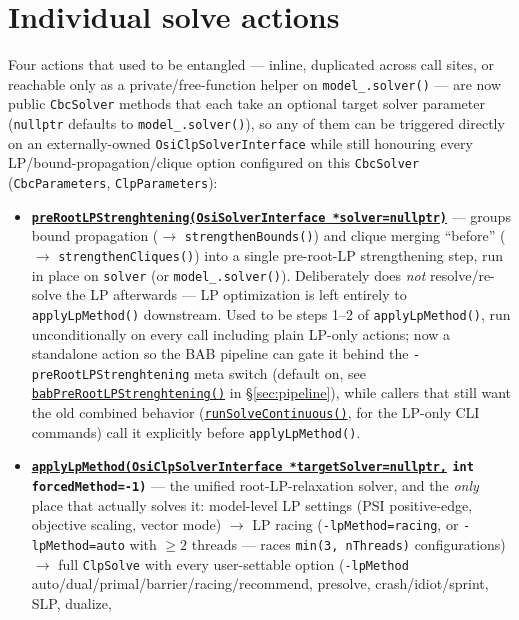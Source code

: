 \documentclass[10pt]{article}
\newcommand{\GHBASE}{https://github.com/coin-or/Cbc/blob/next/src}
\newcommand{\ghc}[2]{\href{\GHBASE/CbcSolver.cpp\#L#1}{#2}}
\newcommand{\swatch}[1]{\tikz[baseline=-0.6ex]{\fill[#1] (0,0) rectangle (0.32,0.32);}}
\begin{document}
\section{Individual solve actions}\label{sec:actions}
Four actions that used to be entangled --- inline, duplicated across call sites, or reachable only as a
private/free-function helper on \texttt{model\_.solver()} --- are now public \texttt{CbcSolver} methods that
each take an optional target solver parameter (\texttt{nullptr} defaults to \texttt{model\_.solver()}), so any
of them can be triggered directly on an externally-owned \texttt{OsiClpSolverInterface} while still honouring
every LP/bound-propagation/clique option configured on this \texttt{CbcSolver} (\texttt{CbcParameters},
\texttt{ClpParameters}):
\begin{itemize}[leftmargin=1.4em, itemsep=1pt]
  \item \textbf{\swatch{capi} \ghc{1220}{\texttt{preRootLPStrenghtening(OsiSolverInterface\,*solver=nullptr)}}} ---
    groups bound propagation ($\to$ \texttt{strengthenBounds()}) and clique merging ``before'' ($\to$
    \texttt{strengthenCliques()}) into a single pre-root-LP strengthening step, run in place on \texttt{solver}
    (or \texttt{model\_.solver()}). Deliberately does \emph{not} resolve/re-solve the LP afterwards --- LP
    optimization is left entirely to \texttt{applyLpMethod()} downstream. Used to be steps 1--2 of
    \texttt{applyLpMethod()}, run unconditionally on every call including plain LP-only actions; now a standalone
    action so the BAB pipeline can gate it behind the \texttt{-preRootLPStrenghtening} meta switch (default on,
    see \ghc{7212}{\texttt{babPreRootLPStrenghtening()}} in \S\ref{sec:pipeline}), while callers that still want
    the old combined behavior (\ghc{1617}{\texttt{runSolveContinuous()}}, for the LP-only CLI commands) call it
    explicitly before \texttt{applyLpMethod()}.
  \item \textbf{\swatch{capi} \ghc{1269}{\texttt{applyLpMethod(OsiClpSolverInterface\,*targetSolver=nullptr,}}
    \texttt{int forcedMethod=-1)}} --- the unified root-LP-relaxation solver, and the \emph{only} place that
    actually solves it: model-level LP settings (PSI positive-edge, objective scaling, vector mode) $\to$ LP
    racing (\texttt{-lpMethod=racing}, or \texttt{-lpMethod=auto} with $\ge 2$ threads --- races
    \texttt{min(3, nThreads)} configurations) $\to$ full \texttt{ClpSolve} with every user-settable option
    (\texttt{-lpMethod} auto/dual/primal/barrier/racing/recommend, presolve, crash/idiot/sprint, SLP, dualize,

\end{itemize}
\end{document}

